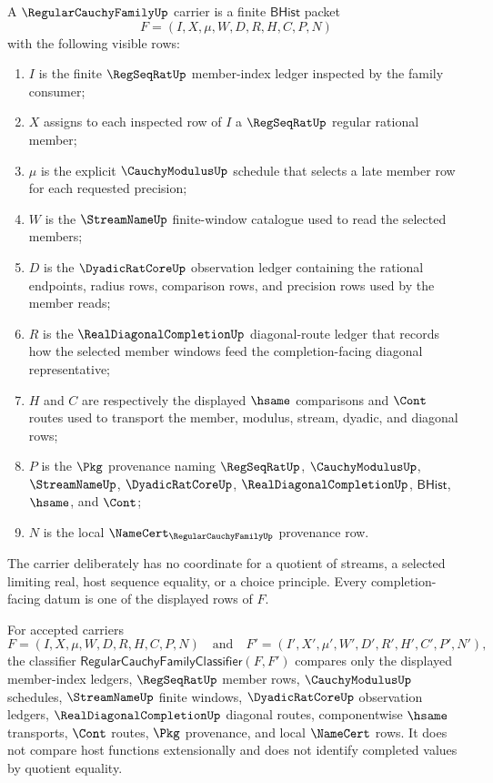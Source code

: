 \begin{definition}
\label{def:regular-cauchy-family-carrier}
A $\RegularCauchyFamilyUp$ carrier is a finite $\mathsf{BHist}$ packet
$$
F=(I,X,\mu,W,D,R,H,C,P,N)
$$
with the following visible rows:
\begin{enumerate}
\item $I$ is the finite $\RegSeqRatUp$ member-index ledger inspected by the family consumer;
\item $X$ assigns to each inspected row of $I$ a $\RegSeqRatUp$ regular rational member;
\item $\mu$ is the explicit $\CauchyModulusUp$ schedule that selects a late member row for each requested precision;
\item $W$ is the $\StreamNameUp$ finite-window catalogue used to read the selected members;
\item $D$ is the $\DyadicRatCoreUp$ observation ledger containing the rational endpoints, radius rows, comparison rows, and precision rows used by the member reads;
\item $R$ is the $\RealDiagonalCompletionUp$ diagonal-route ledger that records how the selected member windows feed the completion-facing diagonal representative;
\item $H$ and $C$ are respectively the displayed $\hsame$ comparisons and $\Cont$ routes used to transport the member, modulus, stream, dyadic, and diagonal rows;
\item $P$ is the $\Pkg$ provenance naming $\RegSeqRatUp$, $\CauchyModulusUp$, $\StreamNameUp$, $\DyadicRatCoreUp$, $\RealDiagonalCompletionUp$, $\mathsf{BHist}$, $\hsame$, and $\Cont$;
\item $N$ is the local $\NameCert_{\RegularCauchyFamilyUp}$ provenance row.
\end{enumerate}
The carrier deliberately has no coordinate for a quotient of streams, a selected limiting real, host sequence equality, or a choice principle. Every completion-facing datum is one of the displayed rows of $F$.
\end{definition}

\begin{definition}
\label{def:regular-cauchy-family-classifier}
For accepted carriers
$$
F=(I,X,\mu,W,D,R,H,C,P,N)
\quad\text{and}\quad
F'=(I',X',\mu',W',D',R',H',C',P',N'),
$$
the classifier $\mathsf{RegularCauchyFamilyClassifier}(F,F')$ compares only the displayed member-index ledgers, $\RegSeqRatUp$ member rows, $\CauchyModulusUp$ schedules, $\StreamNameUp$ finite windows, $\DyadicRatCoreUp$ observation ledgers, $\RealDiagonalCompletionUp$ diagonal routes, componentwise $\hsame$ transports, $\Cont$ routes, $\Pkg$ provenance, and local $\NameCert$ rows. It does not compare host functions extensionally and does not identify completed values by quotient equality.
\end{definition}

